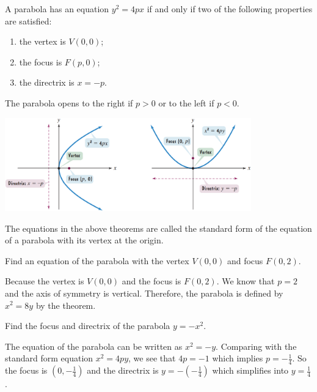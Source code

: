 \begin{theorem}
A parabola has an equation $y^2=4px$ if and only if two of the following properties are satisfied:
\begin{enumerate}[sepno]
    \item the vertex is $V(0, 0)$;
    \item the focus is $F(p, 0)$;
    \item the directrix is $x=-p$.
\end{enumerate}

The parabola opens to the right if $p>0$ or to the left if $p<0$.
\end{theorem}
\begin{center}
    \includegraphics[width=0.8\textwidth,keepaspectratio]{figs/ParabolaGraphs.png}
\end{center}
The equations in the above theorems are called the standard form of the equation of a parabola with its vertex at the origin.

\begin{example}
    Find an equation of the parabola with the vertex $V(0,0)$ and focus $F(0,2)$.
\end{example}
\begin{solution}
    Because the vertex is $V(0, 0)$ and the focus is $F(0, 2)$. We know that $p=2$ and the axis of symmetry is vertical. Therefore, the parabola is defined by $x^2=8y$ by the theorem.
\end{solution}

\begin{example}
Find the focus and directrix of the parabola $y=-x^2$.
\end{example}
\begin{solution}
    The equation of the parabola can be written as $x^2=-y$. Comparing with the standard form equation $x^2=4py$, we see that $4p=-1$ which implies $p=-\frac14$. So the focus is $\left(0, -\frac14\right)$ and the directrix is $y=-\left(-\frac14\right)$ which simplifies into $y=\frac{1}{4}$.
\end{solution}

